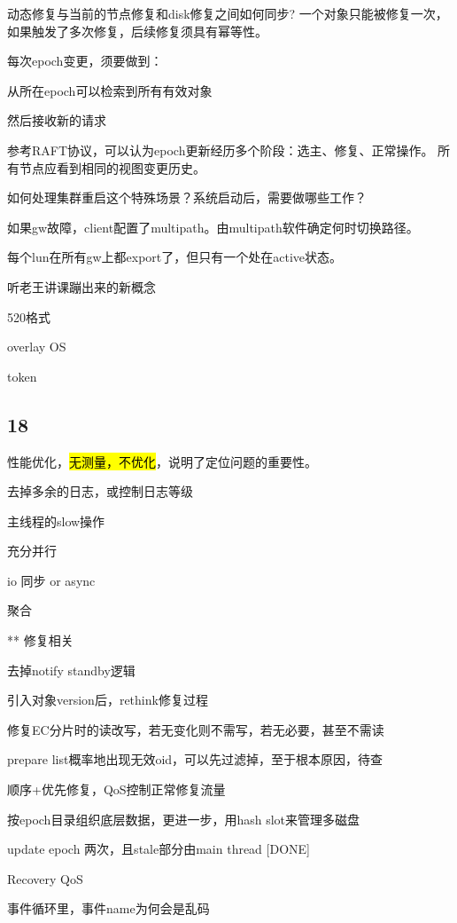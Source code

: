 动态修复与当前的节点修复和disk修复之间如何同步? 一个对象只能被修复一次，如果触发了多次修复，后续修复须具有幂等性。

每次epoch变更，须要做到：
\begin{enumbox}
\item 从所在epoch可以检索到所有有效对象
\item 然后接收新的请求
\end{enumbox}

参考RAFT协议，可以认为epoch更新经历多个阶段：选主、修复、正常操作。
所有节点应看到相同的视图变更历史。

如何处理集群重启这个特殊场景？系统启动后，需要做哪些工作？

\hrulefill

如果gw故障，client配置了multipath。由multipath软件确定何时切换路径。

每个lun在所有gw上都export了，但只有一个处在active状态。

\hrulefill

听老王讲课蹦出来的新概念
\begin{enumbox}
\item 520格式
\item overlay OS
\item token
\end{enumbox}

\subsection{18}

性能优化，\hl{无测量，不优化}，说明了定位问题的重要性。
\begin{enumbox}
\item 去掉多余的日志，或控制日志等级
\item 主线程的slow操作
\item 充分并行
\item io 同步 or async
\item 聚合
\item *** 修复相关
\item 去掉notify standby逻辑
\item 引入对象version后，rethink修复过程
\item 修复EC分片时的读改写，若无变化则不需写，若无必要，甚至不需读
\item prepare list概率地出现无效oid，可以先过滤掉，至于根本原因，待查
\item 顺序+优先修复，QoS控制正常修复流量
\item 按epoch目录组织底层数据，更进一步，用hash slot来管理多磁盘
\item update epoch 两次，且stale部分由main thread [DONE]
\item Recovery QoS
\item 事件循环里，事件name为何会是乱码
\end{enumbox}

